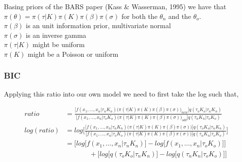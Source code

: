 \documentclass[submit]{smj}
\begin{document}
Basing priors of the BARS paper (Kass \& Wasserman, 1995)
we have that \\ $\pi(\theta) = \pi(\tau|K)\pi(K)\pi(\beta)\pi(\sigma)$ for both the $\theta_{n}$ and the $\theta_{o}$. \\
$\pi(\beta)$ is an unit information prior, multivariate normal\\
$\pi(\sigma)$ is an inverse gamma  \\
$\pi(\tau | K)$ might be uniform \\
$\pi(K)$ might be a Poisson or uniform 


\subsubsection{BIC}
Applying this ratio into our own model we need to first take the log such that,

\begin{align*}
ratio &= \frac{\Big[ f(x_1,\dots,x_n | \tau_{n} K_{n}) %
\big(\pi(\tau|K)\pi(K)\pi(\beta)\pi(\sigma)\big)_{new}%
\Big] 
q(\tau_{o} K_{o} | \tau_{n} K_{n})} %
{\Big[ f(x_1,\dots,x_n | \tau_{o} K_{o}) %
\big(\pi(\tau|K)\pi(K)\pi(\beta)\pi(\sigma)\big)_{old}\Big] %
q(\tau_{n} K_{n}| \tau_{o} K_{o})} %
\\
log(ratio) &= log \Big[\frac{\Big[ f(x_1,\dots,x_n | \tau_{n} K_{n}) %
\big(\pi(\tau|K)\pi(K)\pi(\beta)\pi(\sigma)\big)%
\Big] 
q(\tau_{o} K_{o} | \tau_{n} K_{n})} %
{\Big[ f(x_1,\dots,x_n | \tau_{o} K_{o}) %
\big(\pi(\tau|K)\pi(K)\pi(\beta)\pi(\sigma)\big)\Big] %
q(\tau_{n} K_{n}| \tau_{o} K_{o})} \Big]%
\\
& =\Big[ log \big[ f(x_1,\dots,x_n | \tau_{n} K_{n})
\big] - 
log \big[ f(x_1,\dots,x_n | \tau_{o} K_{o}) \big] \Big]  \\
& \  \ \ \ \ \ \ \  \ \ \ \ \ \ \ \  +  \Big[ log \big[ q(\tau_{o} K_{o} | \tau_{n} K_{n}) \big] - log \big[ q(\tau_{n} K_{n}| \tau_{o} K_{o})  \big] \Big] 
\end{align*}
\end{document}
